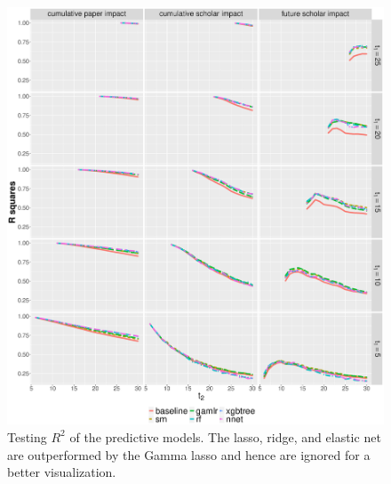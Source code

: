\begin{figure}[ht!]
    \centering
    \includegraphics[width=\textwidth]{figures/pred_model/r2.eps}
    \caption[R squares of the predictive models]{Testing $R^2$ of the predictive models. The lasso, ridge, and elastic net are outperformed by the Gamma lasso and hence are ignored for a better visualization.}
    \label{fig:pred_r2}
\end{figure}






